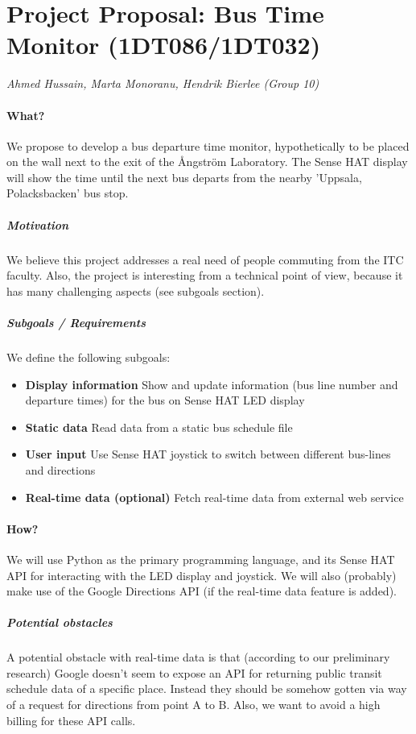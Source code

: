 \documentclass[oneside,a4paper]{paper}
\begin{document}
\pagestyle{empty}

\section*{Project Proposal: Bus Time Monitor (1DT086/1DT032)}

\emph{Ahmed Hussain, Marta Monoranu, Hendrik Bierlee (Group 10)}

\paragraph{What?} We propose to develop a bus departure time monitor, hypothetically to be placed on the wall next to the exit of the Ångström Laboratory.
The Sense HAT display will show the time until the next bus departs from the nearby 'Uppsala, Polacksbacken' bus stop.

\subparagraph{Motivation} We believe this project addresses a real need of people commuting from the ITC faculty.
Also, the project is interesting from a technical point of view, because it has many challenging aspects (see subgoals section).

\subparagraph{Subgoals / Requirements} We define the following subgoals:
\begin{itemize}
	\item \textbf{Display information} Show and update information (bus line number and departure times) for the bus on Sense HAT LED display
	\item \textbf{Static data} Read data from a static bus schedule file
	\item \textbf{User input} Use Sense HAT joystick to switch between different bus-lines and directions
	\item \textbf{Real-time data (optional)} Fetch real-time data from external web service
\end{itemize}
	
\paragraph{How?} We will use Python as the primary programming language, and its Sense HAT API for interacting with the LED display and joystick. We will also (probably) make use of the Google Directions API (if the real-time data feature is added).

\subparagraph{Potential obstacles} A potential obstacle with real-time data is that (according to our preliminary research) Google doesn't seem to expose an API for returning public transit schedule data of a specific place.
Instead they should be somehow gotten via way of a request for directions from point A to B.
Also, we want to avoid a high billing for these API calls.
\end{document}
